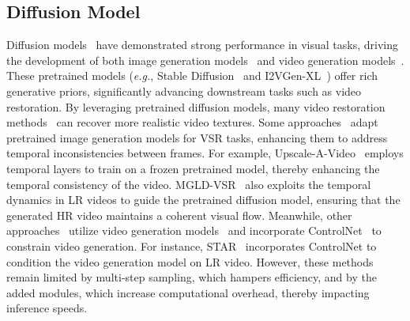 \documentclass{article}
\newcommand\eg{\textit{e.g.}}
\begin{document}
\subsection{Diffusion Model}
\vspace{-1.mm}
Diffusion models~\cite{ho2020denoising} have demonstrated strong performance in visual tasks, driving the development of both image generation models~\cite{rombach2022high,ramesh2022hierarchical, Rombach_2022_CVPR} and video generation models~\cite{blattmann2023stable,zhang2023i2vgen,chen2024videocrafter2}. These pretrained models (\eg, Stable Diffusion~\cite{Rombach_2022_CVPR} and I2VGen-XL~\cite{zhang2023i2vgen}) offer rich generative priors, significantly advancing downstream tasks such as video restoration. By leveraging pretrained diffusion models, many video restoration methods~\cite{yang2024motion,zhou2024upscale,he2024venhancer,xie2025star,wang2025seedvr,li2025diffvsr} can recover more realistic video textures. Some approaches~\cite{yang2024motion,zhou2024upscale,li2025diffvsr} adapt pretrained image generation models for VSR tasks, enhancing them to address temporal inconsistencies between frames. For example, Upscale-A-Video~\cite{zhou2024upscale} employs temporal layers to train on a frozen pretrained model, thereby enhancing the temporal consistency of the video. MGLD-VSR~\cite{yang2024motion} also exploits the temporal dynamics in LR videos to guide the pretrained diffusion model, ensuring that the generated HR video maintains a coherent visual flow. Meanwhile, other approaches~\cite{he2024venhancer,xie2025star} utilize video generation models~\cite{chen2024videocrafter2,zhang2023i2vgen} and incorporate ControlNet~\cite{zhang2023adding} to constrain video generation. For instance, STAR~\cite{xie2025star} incorporates ControlNet to condition the video generation model on LR video. However, these methods remain limited by multi-step sampling, which hampers efficiency, and by the added modules, which increase computational overhead, thereby impacting inference speeds.
\end{document}
